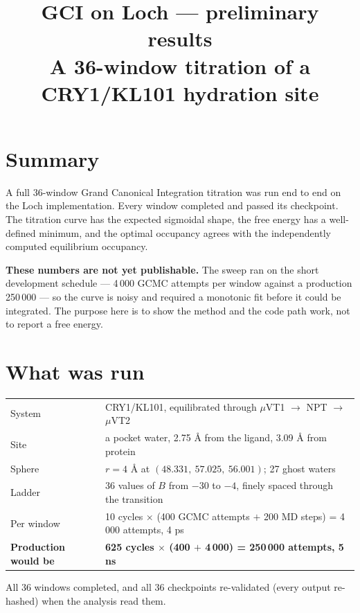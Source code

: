 \documentclass[11pt]{article}
\title{\vspace{-1.5em}GCI on Loch --- preliminary results\\[0.3em]
\large A 36-window titration of a CRY1/KL101 hydration site}
\author{}
\date{}
\begin{document}
\maketitle
\vspace{-2.5em}

\section*{Summary}

A full 36-window Grand Canonical Integration titration was run end to end on the Loch
implementation. Every window completed and passed its checkpoint. The titration curve has
the expected sigmoidal shape, the free energy has a well-defined minimum, and the optimal
occupancy agrees with the independently computed equilibrium occupancy.

\textbf{These numbers are not yet publishable.} The sweep ran on the short development
schedule --- 4\,000 GCMC attempts per window against a production 250\,000 --- so the curve
is noisy and required a monotonic fit before it could be integrated. The purpose here is to
show the method and the code path work, not to report a free energy.

\section{What was run}

\begin{center}\small
\begin{tabular}{@{}l l@{}}
\toprule
System & CRY1/KL101, equilibrated through $\mu$VT1 $\to$ NPT $\to$ $\mu$VT2 \\
Site & a pocket water, 2.75 \AA{} from the ligand, 3.09 \AA{} from protein \\
Sphere & $r = 4$ \AA{} at $(48.331,\ 57.025,\ 56.001)$; 27 ghost waters \\
Ladder & 36 values of $B$ from $-30$ to $-4$, finely spaced through the transition \\
Per window & 10 cycles $\times$ (400 GCMC attempts $+$ 200 MD steps) = 4\,000 attempts, 4 ps \\
\midrule
\textbf{Production would be} & \textbf{625 cycles $\times$ (400 $+$ 4\,000) = 250\,000 attempts, 5 ns} \\
\bottomrule
\end{tabular}
\end{center}

All 36 windows completed, and all 36 checkpoints re-validated (every output re-hashed) when
the analysis read them.
\end{document}
